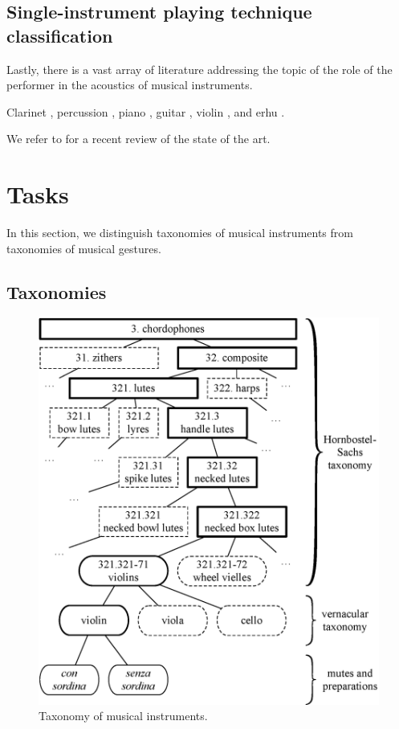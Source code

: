 \documentclass{article}
\begin{document}
\subsection{Single-instrument playing technique classification}

Lastly, there is a vast array of literature addressing the topic of the role of the performer in the acoustics of musical instruments.

\cite{metcalf2014frontiers}

Clarinet \cite{loureiro2004ismir}, percussion \cite{tindale2004ismir}, piano \cite{bernays2013smc}, guitar \cite{foulon2013cmmr,su2014ismir,chen2015ismir}, violin \cite{young2008nime}, and erhu \cite{yang2014fma}.


We refer to \cite{leman2017chapter} for a recent review of the state of the art.



\section{Tasks}
In this section, we distinguish taxonomies of musical instruments from taxonomies of musical gestures.


\subsection{Taxonomies}

\begin{figure}[t!]
\centering
\includegraphics[width=\linewidth]{./figs/dendrograms/instrument-dendrogram.eps}
\caption{Taxonomy of musical instruments.}
\label{fig:instrument-dendrogram}
\end{figure}
\end{document}
